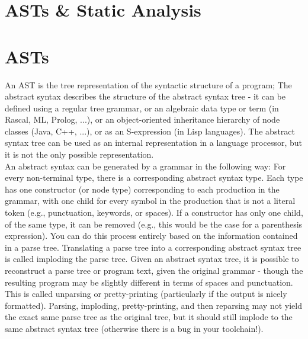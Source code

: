 \section{ASTs \& Static Analysis}
    \section{ASTs}
        An \gls{AST} is the tree representation of the syntactic structure of a program; The abstract syntax
        describes the structure of the abstract syntax tree - it can be defined using a
        regular tree grammar, or an algebraic data type or term (in Rascal, ML, Prolog,
        ...), or an object-oriented inheritance hierarchy of node classes (Java, C++, ...),
        or as an S-expression (in Lisp languages).
        The abstract syntax tree can be used as an internal representation in a language processor, 
        but it is not the only possible representation.\\
        An abstract syntax can be generated by a grammar in the following way:
        For every non-terminal type, there is a corresponding abstract syntax type.
        Each type has one constructor (or node type) corresponding to each production in the grammar, with one child for every symbol in the production that
        is not a literal token (e.g., punctuation, keywords, or spaces). If a constructor
        has only one child, of the same type, it can be removed (e.g., this would be
        the case for a parenthesis expression). You can do this process entirely based
        on the information contained in a parse tree. Translating a parse tree into a
        corresponding abstract syntax tree is called imploding the parse tree.
        Given an abstract syntax tree, it is possible to reconstruct a parse tree or program text, given the original grammar - though the resulting program may be
        slightly different in terms of spaces and punctuation. This is called unparsing or
        pretty-printing (particularly if the output is nicely formatted). Parsing, imploding, pretty-printing, and then reparsing may not yield the exact same parse tree
        as the original tree, but it should still implode to the same abstract syntax tree (otherwise there is a bug in your toolchain!).

